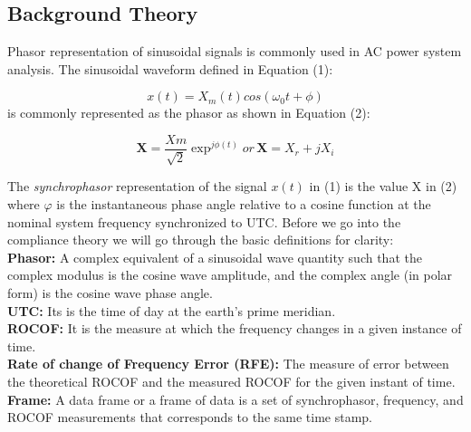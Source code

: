 \subsection{Background Theory}
Phasor representation of sinusoidal signals is commonly used in AC power system analysis. The sinusoidal waveform defined in Equation (1):

\begin{equation}
x(t) = X_m(t) cos(\omega_{0} t + \phi)
\end{equation}
is commonly represented as the phasor as shown in Equation (2):

\begin{equation}
\textbf{X} = \frac{Xm}{\sqrt{2}}\exp^{j\phi(t)}
or\hspace{2pt} \textbf{X} = X_r+jX_i
\end{equation}

The \textit{synchrophasor} representation of the signal $x(t)$ in (1) is the value X in (2) where $\varphi$ is the instantaneous phase angle relative to a cosine function at the nominal system frequency synchronized to UTC. Before we go into the compliance theory we will go through the basic definitions for clarity:\\
\textbf{Phasor:} A complex equivalent of a sinusoidal wave quantity such that the complex modulus is the cosine wave amplitude, and the complex angle (in polar form) is the cosine wave phase angle.\\
\textbf{UTC:} Its is the time of day at the earth's prime meridian.\\
\textbf{ROCOF:} It is the measure at which the frequency changes in a given instance of time.\\
\textbf{Rate of change of Frequency Error (RFE):} The measure of error between the theoretical ROCOF and the measured ROCOF for the given instant of time.\\
\textbf{Frame:} A data frame or a frame of data is a set of synchrophasor, frequency, and ROCOF measurements that corresponds to the same time stamp.\\